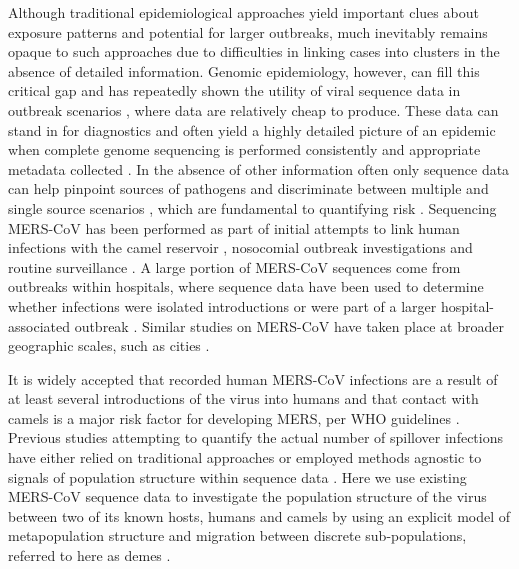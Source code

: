 \documentclass[11pt,oneside,letterpaper]{article}
\def\lmc#1{\textcolor{green}{[#1]}}
\begin{document}
Although traditional epidemiological approaches yield important clues about exposure patterns and potential for larger outbreaks, much inevitably remains opaque to such approaches %
due to difficulties in linking cases into clusters in the absence of detailed information.
Genomic epidemiology, however, can fill this critical gap and has repeatedly shown the utility of viral sequence data in outbreak scenarios \citep{gire_genomic_2014,quick_real-time_2016,arias_rapid_2016}, where data are relatively cheap to produce.
These data can stand in for diagnostics and often yield a highly detailed picture of an epidemic when complete genome sequencing is performed consistently and appropriate metadata collected \citep{dudas_virus_2017}.
In the absence of other information often only sequence data can %
help pinpoint sources of pathogens and discriminate between multiple and single source scenarios \citep{gire_genomic_2014}, which are fundamental to quantifying risk \citep{grubaugh_multiple_2017}.
Sequencing MERS-CoV has been performed as part of initial attempts to link human infections with the camel reservoir \citep{memish_human_2014}, nosocomial outbreak investigations \citep{assiri_hospital_2013} and routine surveillance \citep{park_acute_2015}.
A large portion of MERS-CoV sequences come from %
outbreaks within hospitals, where sequence data have been used to determine whether infections were isolated introductions or were part of a larger hospital-associated outbreak \citep{fagbo_molecular_2015}.
Similar studies on MERS-CoV have taken place at broader geographic scales, such as cities \citep{cotten_2013}.


It is widely accepted that recorded human MERS-CoV infections are a result of at least several introductions of the virus into humans \citep{cotten_2013} and that contact with camels is a major risk factor for developing MERS, per WHO guidelines %
\citep{who_2016_MERS}.
Previous studies attempting to quantify the actual number of spillover infections have either relied on traditional approaches \citep{cauchemez_unraveling_2016} or employed methods agnostic to signals of population structure within sequence data \citep{zhang_evolutionary_2016}.
Here we use existing MERS-CoV sequence data to investigate the population structure of the virus between two of its known hosts, humans and camels by using an explicit model of metapopulation structure and migration between discrete sub-populations, referred to here as demes \citep{vaughan_efficient_2014}.
\end{document}
